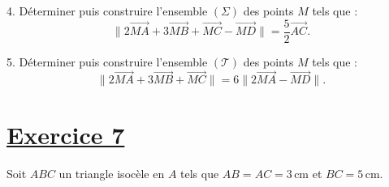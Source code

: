 \documentclass[12pt]{article}
\begin{document}
4. Déterminer puis construire l'ensemble \( (\Sigma) \) des points \( M \) tels que :
\[
\| 2 \overrightarrow{MA} + 3 \overrightarrow{MB} + \overrightarrow{MC} - \overrightarrow{MD} \| = \frac{5}{2} \overrightarrow{AC}.
\]

5. Déterminer puis construire l'ensemble \( (\mathcal{T}) \) des points \( M \) tels que :
\[
\| 2 \overrightarrow{MA} + 3 \overrightarrow{MB} + \overrightarrow{MC} \| = 6 \| 2 \overrightarrow{MA} - \overrightarrow{MD} \|.
\]

\section*{\underline{Exercice 7}}

Soit \( ABC \) un triangle isocèle en \( A \) tels que \( AB = AC = 3 \, \text{cm} \) et \( BC = 5 \, \text{cm} \).
\end{document}
